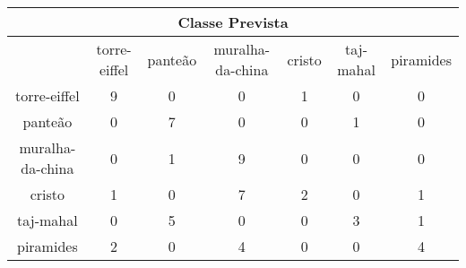 \begin{tabular}{|c|c|c|c|c|c|c|}
\hline
\multicolumn{7}{|c|}{Classe Prevista}\\
\hline
 & torre-eiffel & panteão & muralha-da-china & cristo & taj-mahal & piramides\\
torre-eiffel & 9 & 0 & 0 & 1 & 0 & 0\\
panteão & 0 & 7 & 0 & 0 & 1 & 0\\
muralha-da-china & 0 & 1 & 9 & 0 & 0 & 0\\
cristo & 1 & 0 & 7 & 2 & 0 & 1\\
taj-mahal & 0 & 5 & 0 & 0 & 3 & 1\\
piramides & 2 & 0 & 4 & 0 & 0 & 4\\
\hline
\end{tabular}
